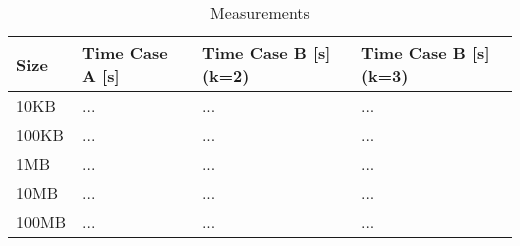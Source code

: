 \begin{table}[H]
	\centering
	\begin{tabular}{|l|l|l|l|}
		\hline
		\cellcolor{lightgray}\textbf{Size} & \cellcolor{lightgray}\textbf{Time Case A [s]} & \cellcolor{lightgray}\textbf{Time Case B [s] (k=2)} & \cellcolor{lightgray}\textbf{Time Case B [s] (k=3)} \\\hline
        10KB  & ...  & ... & ... \\\hline
        100KB & ...  & ... & ... \\\hline
        1MB   & ...  & ... & ... \\\hline
        10MB  & ...  & ... & ... \\\hline
        100MB & ...  & ... & ... \\\hline
	\end{tabular}
	\caption{Measurements}
	\label{tab:e2meas}
\end{table}
